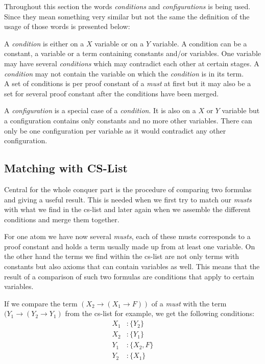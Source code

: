 Throughout this section the words \emph{conditions} and \emph{configurations} is being used. Since they mean something very similar but not the same the definition of the usage of those words is presented below:

\begin{definition}[condition]
A \emph{condition} is either on a $X$ variable or on a $Y$ variable. A condition can be a constant, a variable or a term containing constants and/or variables. One variable may have several \emph{conditions} which may contradict each other at certain stages. A \emph{condition} may not contain the variable on which the \emph{condition} is in its term.\\
A set of conditions is per proof constant of a \emph{must} at first but it may also be a set for several proof constant after the conditions have been merged.
\end{definition}

\begin{definition}[configuration]
A \emph{configuration} is a special case of a \emph{condition}. It is also on a $X$ or $Y$ variable but a configuration contains only constants and no more other variables. There can only be one configuration per variable as it would contradict any other configuration.\\
\end{definition}

\subsection{Matching with CS-List}
Central for the whole conquer part is the procedure of comparing two formulas and giving a useful result. This is needed when we first try to match our \emph{musts} with what we find in the cs-list and later again when we assemble the different conditions and merge them together.

For one atom we have now several \emph{musts}, each of these musts corresponds to a proof constant and holds a term usually made up from at least one variable. On the other hand the terms we find within the cs-list are not only terms with constants but also axioms that can contain variables as well. This means that the result of a comparison of such two formulas are conditions that apply to certain variables. 

If we compare the term $(X_2 \rightarrow (X_1 \rightarrow F))$ of a \emph{must} with the term $(Y_1 \rightarrow (Y_2 \rightarrow Y_1)$ from the cs-list for example, we get the following conditions:
\begin{align*}
	X_1 &: \{Y_2\} \\
	X_2 &: \{Y_1\} \\
	Y_1 &: \{X_2, F\} \\
	Y_2 &: \{X_1\} 
\end{align*}

